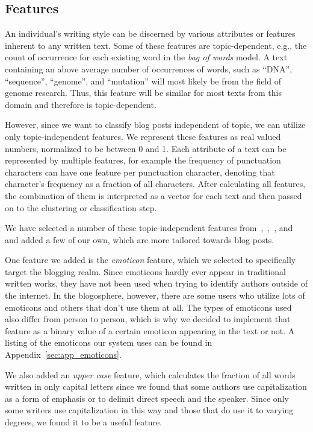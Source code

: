 \subsection{Features}
\label{sec:features}

An individual's writing style can be discerned by various attributes or features inherent to any written text.
Some of these features are topic-dependent, e.g., the count of occurrence for each existing word in the \textit{bag of words} model.
A text containing an above average number of occurrences of words, such as ``DNA'', ``sequence'', ``genome'', and ``mutation'' will most likely be from the field of genome research.
Thus, this feature will be similar for most texts from this domain and therefore is topic-dependent.


However, since we want to classify blog posts independent of topic, we can utilize only topic-independent features.
We represent these features as real valued numbers, normalized to be between 0  and 1.
Each attribute of a text can be represented by multiple features, for example the frequency of punctuation characters can have one feature per punctuation character, denoting that character's frequency as a fraction of all characters.
After calculating all features, the combination of them is interpreted as a vector for each text and then passed on to the clustering or classification step.


We have selected a number of these topic-independent features from~\cite{madigan2005author},~\cite{de2001mining},~\cite{argamon2003style}, and~\cite{narayanan2012feasibility} and added a few of our own, which are more tailored towards blog posts.


One feature we added is the \textit{emoticon} feature, which we selected to specifically target the blogging realm.
Since emoticons hardly ever appear in traditional written works, they have not been used when trying to identify authors outside of the internet.
In the blogosphere, however, there are some users who utilize lots of emoticons and others that don't use them at all.
The types of emoticons used also differ from person to person, which is why we decided to implement that feature as a binary value of a certain emoticon appearing in the text or not.
A listing of the emoticons our system uses can be found in Appendix~\ref{sec:app_emoticons}.


We also added an \textit{upper case} feature, which calculates the fraction of all words written in only capital letters since we found that some authors use capitalization as a form of emphasis or to delimit direct speech and the speaker.
Since only some writers use capitalization in this way and those that do use it to varying degrees, we found it to be a useful feature.


